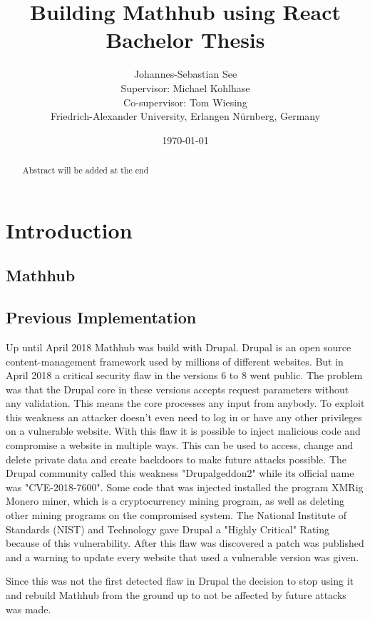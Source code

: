 \documentclass[11pt,a4paper]{article}
\title{Building Mathhub using React\\ \vspace{2 mm} Bachelor Thesis}
\author{Johannes-Sebastian See\\Supervisor: Michael Kohlhase\\Co-supervisor: Tom Wiesing\\Friedrich-Alexander University, Erlangen Nürnberg, Germany}
\date{\today}
\begin{document}
\begin{titlepage}
\maketitle
\begin{abstract}
Abstract will be added at the end
\end{abstract}

\end{titlepage}

\tableofcontents
\section{Introduction}
	\subsection{Mathhub}
	\subsection{Previous Implementation}
	Up until April 2018 Mathhub was build with Drupal. Drupal is an open source content-management framework used by millions of different websites.
	But in April 2018 a critical security flaw in the versions 6 to 8 went public. The problem was that the Drupal core in these versions accepts request parameters without any validation. This means the core processes any input from anybody. To exploit this weakness an attacker doesn't even need to log in or have any other privileges on a vulnerable website. With this flaw it is possible to inject malicious code and compromise a website in multiple ways. This can be used to access, change and delete private data and create backdoors to make future attacks possible. The Drupal community called this weakness "Drupalgeddon2" while its official name was "CVE-2018-7600". Some code that was injected installed the program XMRig Monero miner, which is a cryptocurrency mining program, as well as deleting other mining programs on the compromised system. The National Institute of Standards (NIST) and Technology gave Drupal a "Highly Critical" Rating because of this vulnerability. After this flaw was discovered a patch was published and a warning to update every website that used a vulnerable version was given.
	
Since this was not the first detected flaw in Drupal the decision to stop using it and rebuild Mathhub from the ground up to not be affected by future attacks was made.
\end{document}
